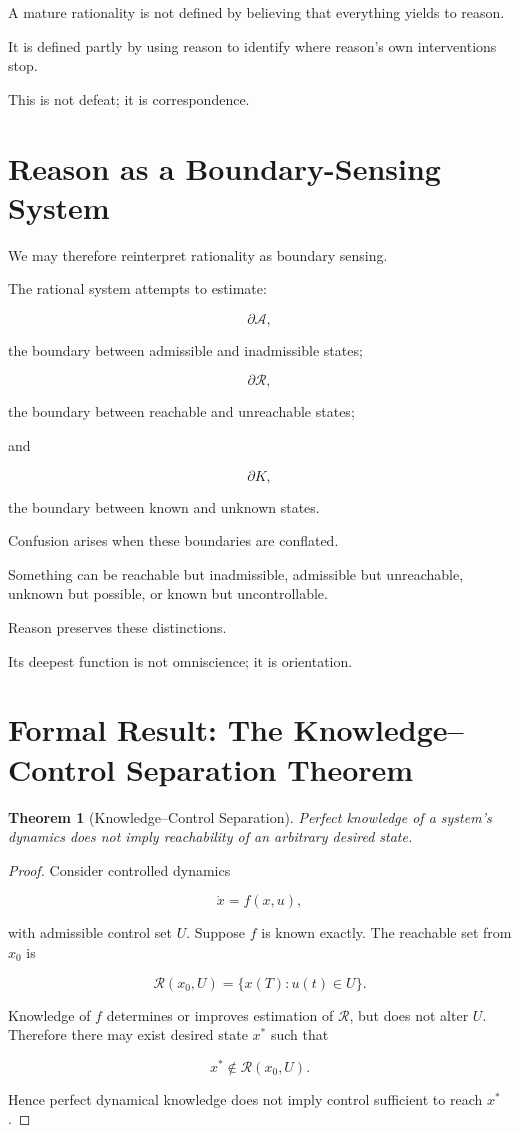 \documentclass[11pt,oneside]{book}
\newtheorem{theorem}{Theorem}[chapter]
\theoremstyle{definition}
\theoremstyle{remark}
\newcommand{\A}{\mathcal{A}}
\newcommand{\R}{\mathcal{R}}
\begin{document}
A mature rationality is not defined by believing that everything yields to reason.

It is defined partly by using reason to identify where reason's own interventions stop.

This is not defeat; it is correspondence.

\section{Reason as a Boundary-Sensing System}

We may therefore reinterpret rationality as boundary sensing.

The rational system attempts to estimate:

\[
\partial\A,
\]

the boundary between admissible and inadmissible states;

\[
\partial\R,
\]

the boundary between reachable and unreachable states;

and

\[
\partial K,
\]

the boundary between known and unknown states.

Confusion arises when these boundaries are conflated.

Something can be reachable but inadmissible, admissible but unreachable, unknown but possible, or known but uncontrollable.

Reason preserves these distinctions.

Its deepest function is not omniscience; it is orientation.

\section{Formal Result: The Knowledge--Control Separation Theorem}

\begin{theorem}[Knowledge--Control Separation]
Perfect knowledge of a system's dynamics does not imply reachability of an arbitrary desired state.
\end{theorem}

\begin{proof}
Consider controlled dynamics

\[
\dot{x}=f(x,u),
\]

with admissible control set \(U\). Suppose \(f\) is known exactly. The reachable set from \(x_0\) is

\[
\R(x_0,U)
=
\{
x(T):
u(t)\in U
\}.
\]

Knowledge of \(f\) determines or improves estimation of \(\R\), but does not alter \(U\). Therefore there may exist desired state \(x^\ast\) such that

\[
x^\ast\notin\R(x_0,U).
\]

Hence perfect dynamical knowledge does not imply control sufficient to reach \(x^\ast\).
\end{proof}
\end{document}
